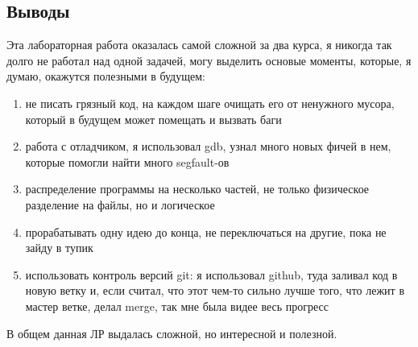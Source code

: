 \documentclass[12pt]{article}
\begin{document}
\subsection*{Выводы}

    Эта лабораторная работа оказалась самой сложной за два курса, я никогда так долго не работал над одной задачей, могу выделить основые моменты, которые, я думаю, окажутся полезными в будущем:
    \begin{enumerate}
        \item не писать грязный код, на каждом шаге очищать его от ненужного мусора, который в будущем может помещать и вызвать баги
        \item работа с отладчиком, я использовал gdb, узнал много новых фичей в нем, которые помогли найти много segfault-ов
        \item распределение программы на несколько частей, не только физическое разделение на файлы, но и логическое 
        \item прорабатывать одну идею до конца, не переключаться на другие, пока не зайду в тупик
        \item использовать контроль версий git: я использовал github, туда заливал код в новую ветку и, если считал, что этот чем-то сильно лучше того, что лежит в мастер ветке, делал merge, так мне была видее весь прогресс
    \end{enumerate}
    В общем данная ЛР выдалась сложной, но интересной и полезной.
\end{document}
